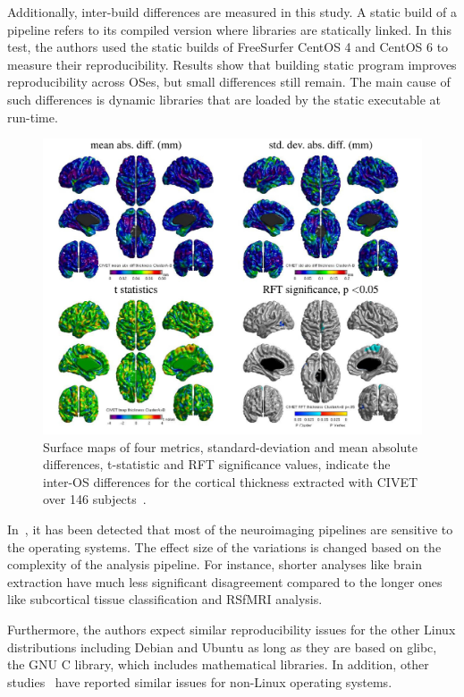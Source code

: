 Additionally, inter-build differences are measured in this study. A 
static build of a pipeline refers to its compiled version where 
libraries are statically linked. In this test, the authors used the 
static builds of FreeSurfer CentOS 4 and CentOS 6 to measure their 
reproducibility. Results show that building static program improves 
reproducibility across OSes, but small differences still remain. The 
main cause of such differences is dynamic libraries that are loaded by 
the static executable at run-time. 

\begin{figure}[H]
\centering
	\includegraphics[scale=0.9]{chapters/background/images/inter-os-diff} 
	\caption{Surface maps of four metrics, standard-deviation and mean 
	absolute differences, t-statistic and RFT significance values, 
	indicate the inter-OS differences for the cortical thickness 
	extracted with CIVET over 146 subjects~\cite{Glatard2015}. } 
	\label{inter_os}
\end{figure}
 

In~\cite{Glatard2015}, it has been detected that most of the 
neuroimaging pipelines are sensitive to the operating 
systems. The effect size of the variations is changed based on the 
complexity of the analysis pipeline. For instance, shorter analyses 
like brain extraction have much less significant disagreement compared 
to the longer ones like subcortical tissue classification and RSfMRI 
analysis.

Furthermore, the authors expect similar reproducibility issues for the 
other Linux distributions including Debian and Ubuntu as long as they 
are based on glibc, the GNU C library, which includes mathematical 
libraries. In addition, other studies~\cite{Gronenschild2012, 
Krefting2011} have reported similar issues for non-Linux operating 
systems. 


